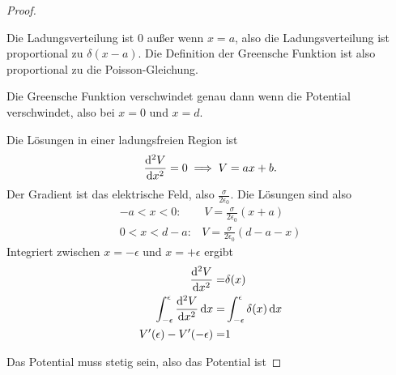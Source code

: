 \begin{proof}
	\begin{parts}
	\item Die Ladungsverteilung ist 0 außer wenn $x=a$, also die Ladungsverteilung ist proportional zu $\delta(x-a)$. Die Definition der Greensche Funktion ist also proportional zu die Poisson-Gleichung.
	
		Die Greensche Funktion verschwindet genau dann wenn die Potential verschwindet, also bei $x=0$ und $x=d$.
	\item Die Lösungen in einer ladungsfreien Region ist
		\[
		\dv[2]{V}{x}=0\implies V = a x + b
		.\] 
		Der Gradient ist das elektrische Feld, also $\frac{\sigma}{2\epsilon_0}$. Die Lösungen sind also
		\begin{align*}
			-a<x<0:&~V = \frac{\sigma}{2\epsilon_0}(x+a)\\
			0<x<d-a:&V= \frac{\sigma}{2\epsilon_0}(d-a-x)
		\end{align*}
		Integriert zwischen $x=-\epsilon$ und $x=+\epsilon$ ergibt
\begin{align*}
	\dv[2]{V}{x}=& \delta(x)\\
	\int_{-\epsilon}^\epsilon \dv[2]{V}{x}\dd{x}=& \int_{-\epsilon}^{\epsilon} \delta(x)\dd{x}\\
	V'(\epsilon)-V'(-\epsilon) =& 1
\end{align*}
	\end{parts}
	Das Potential muss stetig sein, also das Potential ist
\end{proof}

